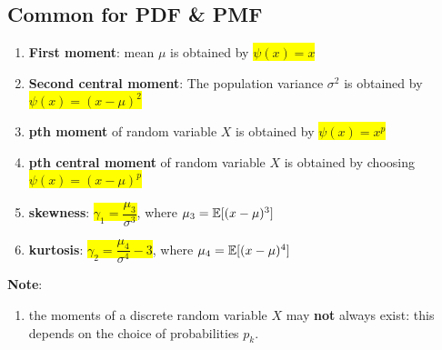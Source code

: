 \subsection{Common for PDF \& PMF}

\begin{enumerate}
    \item \textbf{First moment}: mean $\mu$ is obtained by \colorbox{yellow}{$\psi(x)=x$}
    \hfill \cite{statistics/book/Statistics-for-Data-Scientists/Maurits-Kaptein}

    \item \textbf{Second central moment}: The population variance $\sigma^ 2$ is obtained by \colorbox{yellow}{$\psi(x)=(x -\mu)^2$}
    \hfill \cite{statistics/book/Statistics-for-Data-Scientists/Maurits-Kaptein}

    \item \textbf{pth moment} of random variable $X$ is obtained by \colorbox{yellow}{$\psi(x) = x^p$}
    \hfill \cite{statistics/book/Statistics-for-Data-Scientists/Maurits-Kaptein}

    \item \textbf{pth central moment} of random variable $X$ is obtained by choosing \colorbox{yellow}{$\psi(x) = (x - \mu)^p$}
    \hfill \cite{statistics/book/Statistics-for-Data-Scientists/Maurits-Kaptein}

    \item \textbf{skewness}: \colorbox{yellow}{$\gamma_1 = \dfrac{\mu_3}{\sigma^3}$}, where $\mu_3 = \mathbb{E}[(x-\mu)^3]$
    \hfill \cite{statistics/book/Statistics-for-Data-Scientists/Maurits-Kaptein}

    \item \textbf{kurtosis}: \colorbox{yellow}{$\gamma_2 = \dfrac{\mu_4}{\sigma^4} - 3$}, where $\mu_4 = \mathbb{E}[(x-\mu)^4]$
    \hfill \cite{statistics/book/Statistics-for-Data-Scientists/Maurits-Kaptein}
\end{enumerate}

\vspace{0.5cm}
\textbf{Note}:
\begin{enumerate}
    \item the moments of a discrete random variable $X$ may \textbf{not} always exist: this depends on the choice of probabilities $p _k $.
    \hfill \cite{statistics/book/Statistics-for-Data-Scientists/Maurits-Kaptein}
\end{enumerate}
















